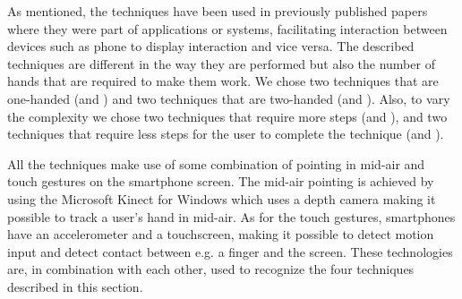 As mentioned, the techniques have been used in previously published papers where they were part of applications or systems, facilitating interaction between devices such as phone to display interaction and vice versa. 
The described techniques are different in the way they are performed but also the number of hands that are required to make them work.
We chose two techniques that are one-handed (\swipe and \tilt) and two techniques that are two-handed (\throw and \pinch).
Also, to vary the complexity we chose two techniques that require more steps (\throw and \pinch), and two techniques that require less steps for the user to complete the technique (\swipe and \tilt).

All the techniques make use of some combination of pointing in mid-air and touch gestures on the smartphone screen.
The mid-air pointing is achieved by using the Microsoft Kinect for Windows which uses a depth camera making it possible to track a user's hand in mid-air.
As for the touch gestures, smartphones have an accelerometer and a touchscreen, making it possible to detect motion input and detect contact between e.g. a finger and the screen.
These technologies are, in combination with each other, used to recognize the four techniques described in this section. 